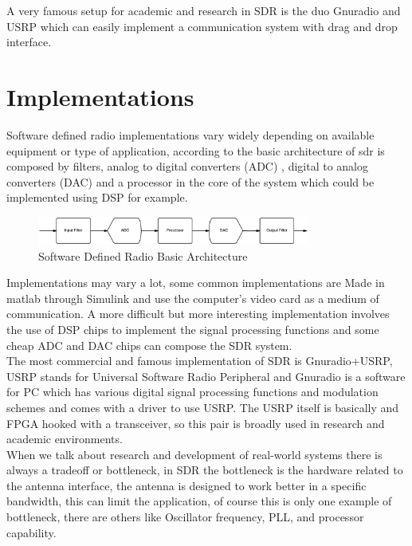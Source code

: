 A very famous setup for academic and research in SDR is the duo Gnuradio
\cite{web:gnuradio} and USRP \cite{web:usrp} which can easily implement a
communication system with drag and drop interface\cite{akbook}.\\


\section{Implementations}

Software defined radio implementations vary widely depending on available
equipment or type of application, according to \cite{ladimer2009} the basic
architecture of sdr is composed by filters, analog to digital converters (ADC) ,
digital to analog converters (DAC) and a processor in the core of the system
which could be implemented using DSP for example.\\

\begin{figure}[htbp]
    \centering
    \includegraphics[width=0.8\textwidth]{./figures/sdr_basic_arch}
    \caption{ Software Defined Radio Basic Architecture
    \label{fig:sdr_basic}}
\end{figure}


Implementations may vary a lot, some common implementations are Made in matlab
through Simulink and use the computer’s video card as a medium of communication.
A more difficult but more interesting implementation involves the use of DSP
chips to implement the signal processing functions and some cheap ADC and DAC
chips can compose the SDR system.\\

The most commercial and famous implementation of SDR is Gnuradio+USRP, USRP
stands for Universal Software Radio Peripheral \cite{web:usrp} and Gnuradio
\cite{web:gnuradio} is a software for PC which has various digital signal
processing functions and modulation schemes and comes with a driver to use USRP.
The USRP itself is basically and FPGA hooked with a transceiver, so this pair is
broadly used in research and academic environments.\\

When we talk about research and development of real-world systems there is
always a tradeoff or bottleneck, in SDR the bottleneck is the hardware related
to the antenna interface, the antenna is designed to work better in a specific
bandwidth, this can limit the application, of course this is only one example of
bottleneck, there are others like Oscillator frequency, PLL, and processor
capability.\\

